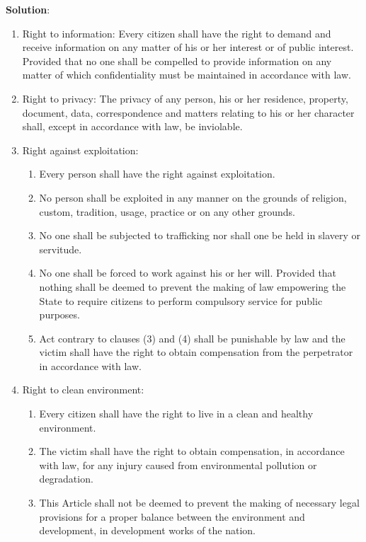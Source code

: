 \documentclass[
]{book}
\newenvironment{solution}{ {\bfseries Solution}:}{}
\begin{document}
\begin{questions}
\begin{solution}
\begin{enumerate}
\item Right to information: Every citizen shall have the right to demand and receive information on any matter of his or her interest or of public interest. Provided that no one shall be compelled to provide information on any matter of which confidentiality must be maintained in accordance with law.
\item Right to privacy: The privacy of any person, his or her residence, property, document, data, correspondence and matters relating to his or her character shall, except in accordance with law, be inviolable.
\item Right against exploitation:
\begin{enumerate}
\item Every person shall have the right against exploitation.
\item No person shall be exploited in any manner on the grounds of religion, custom, tradition, usage, practice or on any other grounds.
\item No one shall be subjected to trafficking nor shall one be held in slavery or servitude.
\item No one shall be forced to work against his or her will. Provided that nothing shall be deemed to prevent the making of law empowering the State to require citizens to perform compulsory service for public purposes.
\item Act contrary to clauses (3) and (4) shall be punishable by law and the victim shall have the right to obtain compensation from the perpetrator in accordance with law.
\end{enumerate}

\item Right to clean environment:
\begin{enumerate}
\item Every citizen shall have the right to live in a clean and healthy environment.
\item The victim shall have the right to obtain compensation, in accordance with law, for any injury caused from environmental pollution or degradation.
\item This Article shall not be deemed to prevent the making of necessary legal provisions for a proper balance between the environment and development, in development works of the nation.
\end{enumerate}


\end{enumerate}
\end{solution}
\end{questions}
\end{document}
